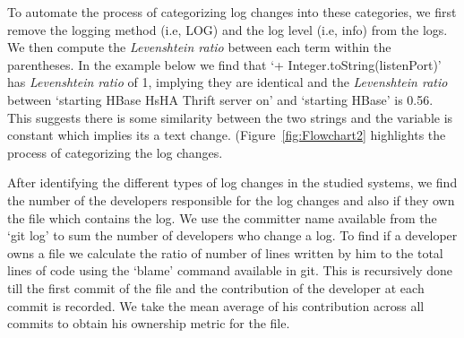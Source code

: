 


To automate the process of categorizing log changes into these categories, we first remove the logging method (i.e, LOG) and the log level (i.e, info) from the logs. We then compute the \textsl{Levenshtein ratio} between each term within the parentheses. In the example below we find that `+ Integer.toString(listenPort)' has \textsl{Levenshtein ratio} of 1, implying they are identical and the \textsl{Levenshtein ratio} between `starting HBase HsHA Thrift server on' and `starting HBase' is 0.56. This suggests there is some similarity between the two strings and the variable is constant which implies its a text change. (Figure~\ref{fig:Flowchart2} highlights the process of categorizing the log changes.



After identifying the different types of log changes in the studied systems, we find the number of the developers responsible for the log changes and also if they own the file which contains the log. We use the committer name available from the `git log' to sum the number of developers who change a log. To find if a developer owns a file we calculate the ratio of number of lines written by him to the total lines of code using the `blame' command available in git. This is recursively done till the first commit of the file and the contribution of the developer at each commit is recorded.  We take the mean average of his contribution across all commits to obtain his ownership metric for the file. 

